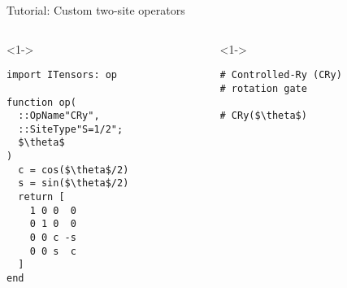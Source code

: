 \begin{frame}[fragile]{Tutorial: Custom two-site operators}

\begin{columns}

\begin{column}{5cm}

\begin{onlyenv}<1->

\begin{lstlisting}[language=JuliaLocal, style=julia, mathescape, basicstyle=\small]
import ITensors: op

function op(
  ::OpName"CRy",
  ::SiteType"S=1/2";
  $\theta$
)
  c = cos($\theta$/2)
  s = sin($\theta$/2)
  return [
    1 0 0  0
    0 1 0  0
    0 0 c -s
    0 0 s  c
  ]
end
\end{lstlisting}

\end{onlyenv}


\end{column}

\begin{column}{5cm}

\begin{onlyenv}<1->

\begin{lstlisting}[style=julia, numbers=none, mathescape, basicstyle=\small]
# Controlled-Ry (CRy)
# rotation gate

# CRy($\theta$)











 \end{lstlisting}

\end{onlyenv}


\end{column}

\end{columns}

\end{frame}
